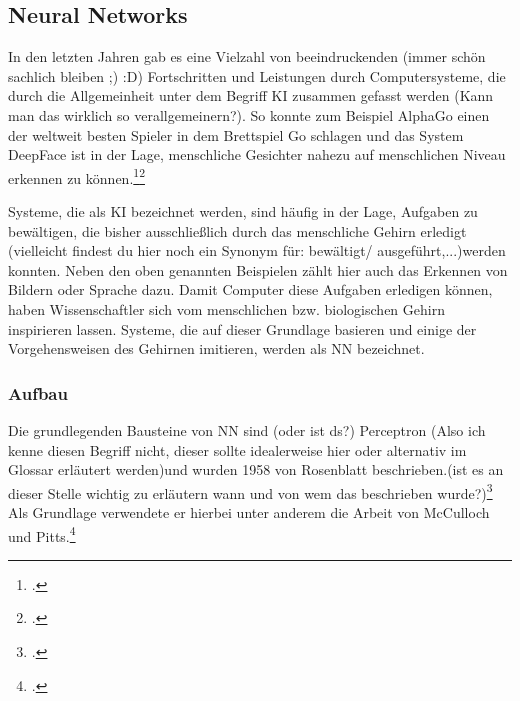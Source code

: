
\subsection{Neural Networks} \label{sec:NN}
In den letzten Jahren gab es eine Vielzahl von beeindruckenden (immer schön sachlich bleiben ;) :D) Fortschritten und Leistungen durch Computersysteme, die durch die Allgemeinheit unter dem Begriff \ac{KI} zusammen gefasst werden (Kann man das wirklich so verallgemeinern?). So konnte zum Beispiel AlphaGo einen der weltweit besten Spieler in dem Brettspiel Go schlagen und das System DeepFace ist in der Lage, menschliche Gesichter nahezu auf menschlichen Niveau erkennen zu können.\footcites[Vgl.][]{spiegelGoogleComputerAlphaGo2016}\footcite[Vgl.][]{taigman2014deepface}

Systeme, die als \ac{KI} bezeichnet werden, sind häufig in der Lage, Aufgaben zu bewältigen, die bisher ausschließlich durch das menschliche Gehirn erledigt (vielleicht findest du hier noch ein Synonym für: bewältigt/ ausgeführt,...)werden konnten. Neben den oben genannten Beispielen zählt hier auch das Erkennen von Bildern oder Sprache dazu. Damit Computer diese Aufgaben erledigen können, haben Wissenschaftler sich vom menschlichen bzw. biologischen Gehirn inspirieren lassen. Systeme, die auf dieser Grundlage basieren und einige der Vorgehensweisen des Gehirnen imitieren, werden als \ac{NN} bezeichnet.

\subsubsection{Aufbau}
Die grundlegenden Bausteine von \ac{NN} sind (oder ist ds?) Perceptron (Also ich kenne diesen Begriff nicht, dieser sollte idealerweise hier oder alternativ im Glossar erläutert werden)und wurden 1958 von Rosenblatt beschrieben.(ist es an dieser Stelle wichtig zu erläutern wann und von wem das beschrieben wurde?)\footcite[Vgl.][]{rosenblattPerceptronProbabilisticModel1958} Als Grundlage verwendete er hierbei unter anderem die Arbeit von McCulloch und Pitts.\footcite[Vgl.][]{mccullochLogicalCalculusIdeas1943}


